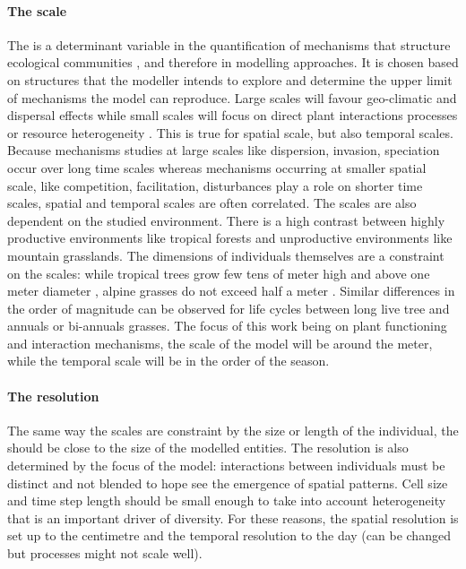 \paragraph{The scale}
The  is a determinant variable in the quantification of mechanisms that structure ecological communities \parencite{bello_hierarchical_2013}, and therefore in modelling approaches. It is chosen based on structures that the modeller intends to explore and determine the upper limit of mechanisms the model can reproduce. Large scales will favour geo-climatic and dispersal effects \parencite{kleidon_global_2000} while small scales will focus on direct plant interactions processes or resource heterogeneity \parencite{ soussana_gemini:_2012, maire_plasticity_2013, taubert_modelling_2014}. This is true for spatial scale, but also temporal scales. Because mechanisms studies at large scales like dispersion, invasion, speciation occur over long time scales whereas mechanisms occurring at smaller spatial scale, like competition, facilitation, disturbances play a role on shorter time scales, spatial and temporal scales are often correlated. The scales are also dependent on the studied environment. There is a high contrast between highly productive environments like tropical forests and unproductive environments like mountain grasslands. The dimensions of individuals themselves are a constraint on the scales: while tropical trees grow few tens of meter high and above one meter diameter \parencite{}, alpine grasses do not exceed half a meter \parencite{korner_alpine_2011}. Similar differences in the order of magnitude can be observed for life cycles between long live tree and annuals or bi-annuals grasses. The focus of this work being on plant functioning and interaction mechanisms, the scale of the model will be around the meter, while the temporal scale will be in the order of the season.

\paragraph{The resolution} The same way the scales are constraint by the size or length of the individual, the  should be close to the size of the modelled entities. The resolution is also determined by the focus of the model: interactions between individuals must be distinct and not blended to hope see the emergence of spatial patterns. Cell size and time step length should be small enough to take into account heterogeneity that is an important driver of diversity. For these reasons, the spatial resolution is set up to the centimetre and the temporal resolution to the day (can be changed but processes might not scale well).

